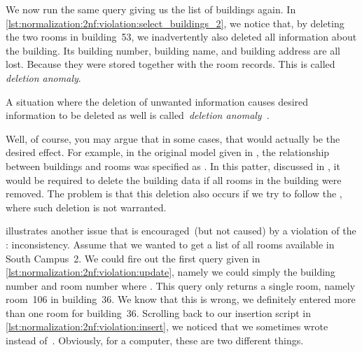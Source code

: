 We now run the same query giving us the list of buildings again.
In \cref{lst:normalization:2nf:violation:select_buildings_2}, we notice that, by deleting the two rooms in building~53, we inadvertently also deleted all information about the building.
Its building number, building name, and building address are all lost.
Because they were stored together with the room records.
This is called \emph{deletion anomaly}.%
%
\begin{definition}%
A situation where the deletion of unwanted information causes desired information to be deleted as well is called~\emph{deletion anomaly}~\cite{S2024D:RNDAFDNF}.%
\end{definition}%
%
Well, of course, you may argue that in some cases, that would actually be the desired effect.
For example, in the original model given in , the relationship between buildings and rooms was specified as .
In this patter, discussed in , it would be required to delete the building data if all rooms in the building were removed.
The problem is that this deletion also occurs if we try to follow the , where such deletion is not warranted.

 illustrates another issue that is encouraged~(but not caused) by a violation of the : inconsistency.
Assume that we wanted to get a list of all rooms available in South Campus~2.
We could fire out the first query given in \cref{lst:normalization:2nf:violation:update}, namely we could simply  the building number and room number where .
This query only returns a single room, namely room~106 in building~36.
We know that this is wrong, we definitely entered more than one room for building~36.
Scrolling back to our insertion script in \cref{lst:normalization:2nf:violation:insert}, we noticed that we sometimes wrote~ instead of~.
Obviously, for a computer, these are two different things.

